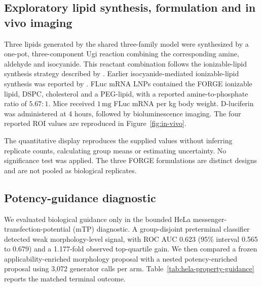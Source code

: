 \documentclass{article}
\theoremstyle{definition}
\newcommand{\ForgePotencyAUC}{0.623}
\newcommand{\ForgePotencyAUCCIHigh}{0.679}
\newcommand{\ForgePotencyAUCCILow}{0.565}
\newcommand{\ForgePotencyAttemptsPerArm}{3{,}072}
\newcommand{\ForgePotencyTopQuartileGain}{1.177}
\begin{document}
\FloatBarrier
\subsection{Exploratory lipid synthesis, formulation and in vivo imaging}
\label{app:in-vivo-methods}

Three lipids generated by the shared three-family model were synthesized by a one-pot,
three-component Ugi reaction combining the corresponding amine, aldehyde and isocyanide. This
reactant combination follows the ionizable-lipid synthesis strategy described by
\citet{chen2023muscle}. Earlier isocyanide-mediated ionizable-lipid synthesis was reported by
\citet{miao2019heterocyclic}.
FLuc mRNA LNPs contained the FORGE ionizable lipid, DSPC, cholesterol and a PEG-lipid, with a
reported amine-to-phosphate ratio of $5.67:1$. Mice received $1\,\mathrm{mg}$ FLuc mRNA per kg
body weight. D-luciferin was administered at 4 hours, followed by bioluminescence imaging.
The four reported ROI values are reproduced in Figure~\ref{fig:in-vivo}.


The quantitative display reproduces the supplied values without inferring replicate counts,
calculating group means or estimating uncertainty. No significance test was applied. The three
FORGE formulations are distinct designs and are not pooled as biological replicates.

\subsection{Potency-guidance diagnostic}
\label{app:guidance-results}

We evaluated biological guidance only in the bounded HeLa messenger-transfection-potential (mTP)
diagnostic. A group-disjoint preterminal classifier detected weak morphology-level signal, with ROC
AUC \ForgePotencyAUC{} (95\% interval \ForgePotencyAUCCILow{} to \ForgePotencyAUCCIHigh) and a
\ForgePotencyTopQuartileGain-fold observed top-quartile gain. We then compared a frozen
applicability-enriched morphology proposal with a nested potency-enriched proposal using
\ForgePotencyAttemptsPerArm{} generator calls per arm. Table~\ref{tab:hela-property-guidance}
reports the matched terminal outcome.
\end{document}
